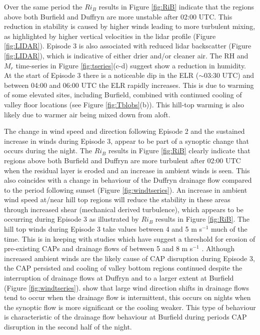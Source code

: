 \documentclass[times]{qjrms4}
\begin{document}
Over the same period the $Ri_B$ results in Figure \ref{fig:RiB} indicate that the regions above both Burfield and Duffryn are more unstable after 02:00 UTC. This reduction in stability is caused by higher winds leading to more turbulent mixing, as highlighted by higher vertical velocities in the lidar profile (Figure \ref{fig:LIDAR}). Episode 3 is also associated with reduced lidar backscatter (Figure \ref{fig:LIDAR}), which is indicative of either drier and/or cleaner air. The RH and $M_r$ time-series in Figure \ref{fig:tseries}(c-d) suggest show a reduction in humidity. At the start of Episode 3 there is a noticeable dip in the ELR ($\sim$03:30 UTC) and between 04:00 and 06:00 UTC the ELR rapidly increases. This is due to warming of some elevated sites, including Burfield, combined with continued cooling of valley floor locations (see Figure \ref{fig:Tblobs}(b)). This hill-top warming is also likely due to warmer air being mixed down from aloft.

The change in wind speed and direction following Episode 2 and the sustained increase in winds during Episode 3, appear to be part of a synoptic change that occurs during the night. The $Ri_B$ results in Figure \ref{fig:RiB} clearly indicate that regions above both Burfield and Duffryn are more turbulent after 02:00 UTC when the residual layer is eroded and an increase in ambient winds is seen. This also coincides with a change in behaviour of the Duffryn drainage flow compared to the period following sunset (Figure \ref{fig:windtseries}). An increase in ambient wind speed at/near hill top regions will reduce the stability in these areas through increased shear (mechanical derived turbulence), which appears to be occurring during Episode 3 as illustrated by $Ri_B$ results in Figure \ref{fig:RiB}. The hill top winds during Episode 3 take values between 4 and 5 m s$^{-1}$ much of the time. This is in keeping with studies which have suggest a threshold for erosion of pre-existing CAPs and drainage flows of between 5 and 8 m s$^{-1}$ \citep{barr1989influence,orgill1992mesoscale,bogren2000local,iijima2000seasonal,whiteman2001cold,vosper2008numerical}. Although increased ambient winds are the likely cause of CAP disruption during Episode 3, the CAP persisted and cooling of valley bottom regions continued despite the interruption of drainage flows at Duffryn and to a larger extent at Burfield (Figure \ref{fig:windtseries}). \citet{mahrt2010non} show that large wind direction shifts in drainage flows tend to occur when the drainage flow is intermittent, this occurs on nights when the synoptic flow is more significant or the cooling weaker. This type of behaviour is characteristic of the drainage flow behaviour at Burfield during periods CAP disruption in the second half of the night.
\end{document}
